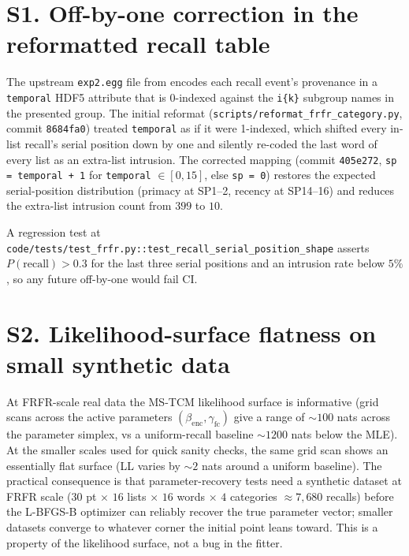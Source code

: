 \documentclass{article}
\begin{document}
\section*{S1. Off-by-one correction in the reformatted recall table}

The upstream \texttt{exp2.egg} file from \cite{ManningEtAl2023FRFR} encodes
each recall event's provenance in a \texttt{temporal} HDF5 attribute that is
0-indexed against the \texttt{i\{k\}} subgroup names in the presented
group. The initial reformat (\texttt{scripts/reformat\_frfr\_category.py},
commit \texttt{8684fa0}) treated \texttt{temporal} as if it were 1-indexed,
which shifted every in-list recall's serial position down by one and
silently re-coded the last word of every list as an extra-list intrusion.
The corrected mapping (commit \texttt{405e272}, \texttt{sp = temporal + 1}
for \texttt{temporal} $\in [0, 15]$, else \texttt{sp = 0}) restores the
expected serial-position distribution (primacy at SP1--2, recency at
SP14--16) and reduces the extra-list intrusion count from $399$ to $10$.

A regression test at
\texttt{code/tests/test\_frfr.py::test\_recall\_serial\_position\_shape}
asserts $P(\text{recall}) > 0.3$ for the last three serial positions and
an intrusion rate below $5\%$, so any future off-by-one would fail CI.

\section*{S2. Likelihood-surface flatness on small synthetic data}

At FRFR-scale real data the MS-TCM likelihood surface is informative
(grid scans across the active parameters $(\beta_{\mathrm{enc}}, \gamma_{\mathrm{fc}})$ give a
range of $\sim 100$ nats across the parameter simplex, vs a
uniform-recall baseline $\sim 1200$ nats below the MLE). At the smaller
scales used for quick sanity checks, the same grid scan shows an
essentially flat surface (LL varies by $\sim 2$ nats around a uniform
baseline). The practical consequence is that parameter-recovery tests
need a synthetic dataset at FRFR scale ($30$ pt $\times$ $16$ lists
$\times$ $16$ words $\times$ $4$ categories $\approx 7{,}680$ recalls)
before the L-BFGS-B optimizer can reliably recover the true parameter
vector; smaller datasets converge to whatever corner the initial point
leans toward. This is a property of the likelihood surface, not a bug
in the fitter.
\end{document}
